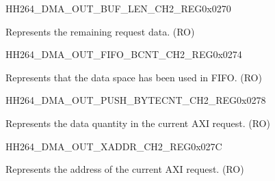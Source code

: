 \begin{register}{H}{H264\_DMA\_OUT\_BUF\_LEN\_CH2\_REG}{0x0270}\label{regdesc:H264DMAOUTBUFLENCH2REG}
%
%
\regnewline%
\begin{regdesc}\begin{reglist}
\label{fielddesc:H264DMAOUTCMDFIFOBUFLENHBCH2}\item [H264\_DMA\_OUT\_CMDFIFO\_BUF\_LEN\_HB\_CH2] Represents the remaining request data. (RO)
\end{reglist}\end{regdesc}
\end{register}


\begin{register}{H}{H264\_DMA\_OUT\_FIFO\_BCNT\_CH2\_REG}{0x0274}\label{regdesc:H264DMAOUTFIFOBCNTCH2REG}
%
%
\regnewline%
\begin{regdesc}\begin{reglist}
\label{fielddesc:H264DMAOUTCMDFIFOOUTFIFOBCNTCH2}\item [H264\_DMA\_OUT\_CMDFIFO\_OUTFIFO\_BCNT\_CH2] Represents that the data space has been used in FIFO. (RO)
\end{reglist}\end{regdesc}
\end{register}


\begin{register}{H}{H264\_DMA\_OUT\_PUSH\_BYTECNT\_CH2\_REG}{0x0278}\label{regdesc:H264DMAOUTPUSHBYTECNTCH2REG}
%
%
\regnewline%
\begin{regdesc}\begin{reglist}
\label{fielddesc:H264DMAOUTCMDFIFOPUSHBYTECNTCH2}\item [H264\_DMA\_OUT\_CMDFIFO\_PUSH\_BYTECNT\_CH2] Represents the data quantity in the current AXI request. (RO)
\end{reglist}\end{regdesc}
\end{register}


\begin{register}{H}{H264\_DMA\_OUT\_XADDR\_CH2\_REG}{0x027C}\label{regdesc:H264DMAOUTXADDRCH2REG}
%
\regnewline%
\begin{regdesc}\begin{reglist}
\label{fielddesc:H264DMAOUTCMDFIFOXADDRCH2}\item [H264\_DMA\_OUT\_CMDFIFO\_XADDR\_CH2] Represents the address of the current AXI request. (RO)
\end{reglist}\end{regdesc}
\end{register}

